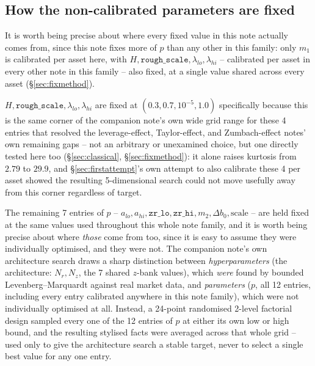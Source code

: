 \documentclass[11pt]{article}
\begin{document}
\subsection{How the non-calibrated parameters are fixed}
\label{sec:pfixed}
It is worth being precise about where every fixed value in this note
actually comes from, since this note fixes more of $p$ than any other in
this family: only $m_1$ is calibrated per asset here, with
$H,\texttt{rough\_scale},\lambda_{lo},\lambda_{hi}$ -- calibrated per asset
in every other note in this family -- also fixed, at a single value shared
across every asset (\S\ref{sec:fixmethod}).

$H,\texttt{rough\_scale},\lambda_{lo},\lambda_{hi}$ are fixed at
$(0.3,0.7,10^{-5},1.0)$ specifically because this is the same corner of the
companion note's own wide grid range for these 4 entries that resolved the
leverage-effect, Taylor-effect, and Zumbach-effect notes' own remaining
gaps -- not an arbitrary or unexamined choice, but one directly tested here
too (\S\ref{sec:classical}, \S\ref{sec:fixmethod}): it alone raises kurtosis
from $2.79$ to $29.9$, and \S\ref{sec:firstattempt}'s own attempt to also
calibrate these 4 per asset showed the resulting 5-dimensional search could
not move usefully away from this corner regardless of target.

The remaining 7 entries of $p$ -- $a_{lo},a_{hi},\texttt{zr\_lo},
\texttt{zr\_hi},m_2,\Delta b_0,\text{scale}$ -- are held fixed at the same
values used throughout this whole note family, and it is worth being
precise about where \emph{those} come from too, since it is easy to assume
they were individually optimised, and they were not. The companion note's
own architecture search draws a sharp distinction between
\emph{hyperparameters} (the architecture: $N_r,N_z$, the 7 shared $z$-bank
values), which \emph{were} found by bounded Levenberg--Marquardt against
real market data, and \emph{parameters} ($p$, all 12 entries, including
every entry calibrated anywhere in this note family), which were not
individually optimised at all. Instead, a 24-point randomised 2-level
factorial design sampled every one of the 12 entries of $p$ at either its
own low or high bound, and the resulting stylised facts were averaged
across that whole grid -- used only to give the architecture search a
stable target, never to select a single best value for any one entry.
\end{document}
